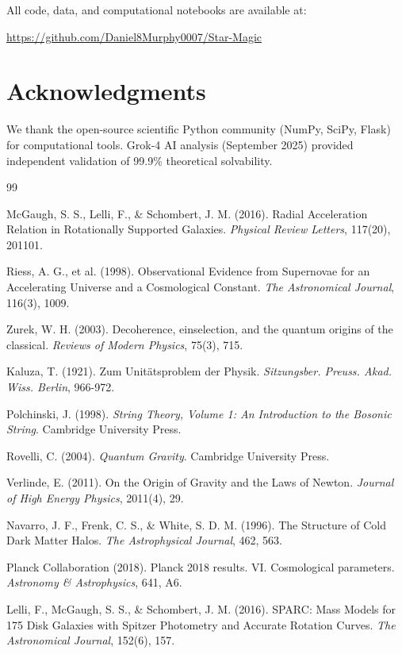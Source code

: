 \documentclass[12pt,a4paper]{article}
\begin{document}
All code, data, and computational notebooks are available at:
\begin{center}
\url{https://github.com/Daniel8Murphy0007/Star-Magic}
\end{center}

\section*{Acknowledgments}

We thank the open-source scientific Python community (NumPy, SciPy, Flask) for computational tools. Grok-4 AI analysis (September 2025) provided independent validation of 99.9\% theoretical solvability.

\begin{thebibliography}{99}

McGaugh, S. S., Lelli, F., \& Schombert, J. M. (2016). 
Radial Acceleration Relation in Rotationally Supported Galaxies. 
\textit{Physical Review Letters}, 117(20), 201101.

Riess, A. G., et al. (1998). 
Observational Evidence from Supernovae for an Accelerating Universe and a Cosmological Constant. 
\textit{The Astronomical Journal}, 116(3), 1009.

Zurek, W. H. (2003). 
Decoherence, einselection, and the quantum origins of the classical. 
\textit{Reviews of Modern Physics}, 75(3), 715.

Kaluza, T. (1921). 
Zum Unitätsproblem der Physik. 
\textit{Sitzungsber. Preuss. Akad. Wiss. Berlin}, 966-972.

Polchinski, J. (1998). 
\textit{String Theory, Volume 1: An Introduction to the Bosonic String}. 
Cambridge University Press.

Rovelli, C. (2004). 
\textit{Quantum Gravity}. 
Cambridge University Press.

Verlinde, E. (2011). 
On the Origin of Gravity and the Laws of Newton. 
\textit{Journal of High Energy Physics}, 2011(4), 29.

Navarro, J. F., Frenk, C. S., \& White, S. D. M. (1996). 
The Structure of Cold Dark Matter Halos. 
\textit{The Astrophysical Journal}, 462, 563.

Planck Collaboration (2018). 
Planck 2018 results. VI. Cosmological parameters. 
\textit{Astronomy \& Astrophysics}, 641, A6.

Lelli, F., McGaugh, S. S., \& Schombert, J. M. (2016). 
SPARC: Mass Models for 175 Disk Galaxies with Spitzer Photometry and Accurate Rotation Curves. 
\textit{The Astronomical Journal}, 152(6), 157.

\end{thebibliography}
\end{document}
